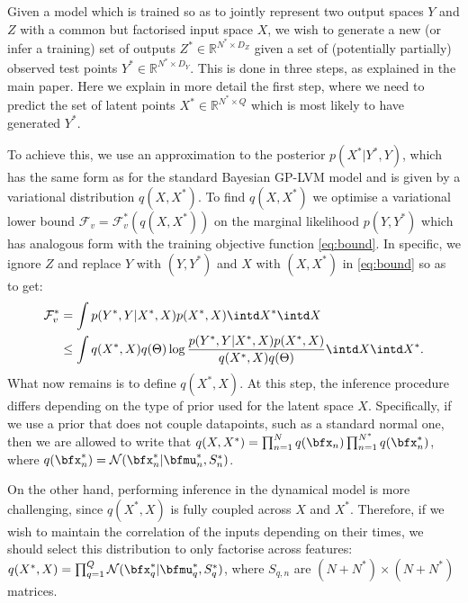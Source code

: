 Given a model which is trained so as to jointly represent two output spaces $Y$ and $Z$ with
a common but factorised input space $X$, we wish to generate a new (or infer a training) set of outputs
$Z^* \in \mathbb{R}^{N^* \times D_Z}$ given a set of (potentially partially) observed test points $Y^* \in \mathbb{R}^{N^* \times D_Y}$.
This is done in three steps, as explained in the main paper. Here we explain in more detail the first step, where we need to predict
 the set of latent points $X^* \in \mathbb{R}^{N^* \times Q}$
which is most likely to have generated $Y^*$. 
\par To achieve this, we use an approximation to the posterior $p(X^*|Y^*,Y)$,
which has the same form as for the standard Bayesian GP-LVM model \cite{Titsias:bayesGPLVM10} and is given by a variational distribution
 $q(X,X^*)$. To find $q(X,X^*)$ we optimise a variational lower bound $\mathcal{F}_v = \mathcal{F}^*_v \left(q(X,X^*) \right)$
on the marginal likelihood $p(Y,Y^*)$ which has analogous form with the training
  objective function \eqref{eq:bound}. In specific, we ignore $Z$ and replace $Y$ with $(Y,Y^*)$ and $X$ with $(X,X^*)$ in \eqref{eq:bound}
so as to get:
\begin{align}
 \mathcal{F}^*_v 
   & = \int p(Y^*,Y | X^*,X) p(X^*,X) \intd X^* \intd X \nonumber \\
   & \leq \int q(X^*,X) q(\Theta) \log 
      \frac{p(Y^*,Y | X^*,X) p(X^*,X)}{q(X^*,X) q(\Theta)} \intd X \intd X^* .
\end{align}
What now remains is to define $q(X^*,X)$. At this step, the inference procedure differs depending on the type of prior used for the latent space $X$.
Specifically, if we use a prior that does not couple datapoints, such as a standard normal one, then we are allowed to
write that $q(X,X^*) = \prod_{n=1}^N q(\bfx_n) \prod_{n=1}^{N^*} q(\bfx_n^*)$, 
where $q(\bfx_n^*) = \mathcal{N}(\bfx_n^* | \bfmu_n^*, S_n^*)$.

\par On the other hand, performing inference in the dynamical model is more challenging, since $q(X^*,X)$ is fully
coupled across $X$ and $X^*$. Therefore, if we wish to maintain the correlation of the inputs depending on their times,
we should select this distribution to only factorise across features: 
$q(X^*,X) = \prod_{q=1}^Q  \mathcal{N} (\bfx_q^* | \bfmu_q^* ,S_q^*)$,
 where $S_{q,n}$ are $(N+N^*) \times (N+N^*)$ matrices.



